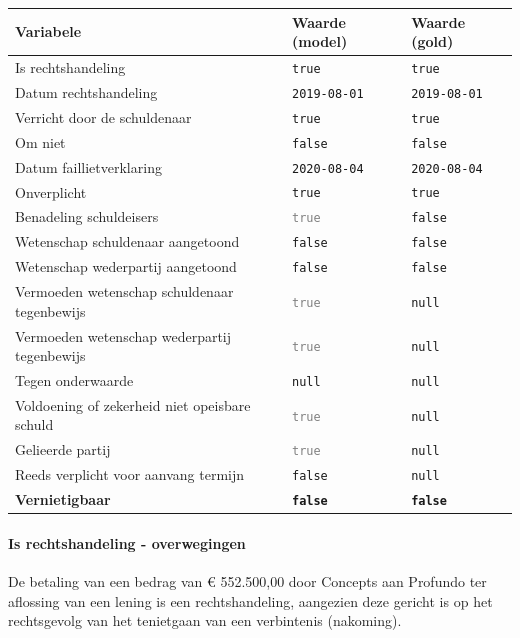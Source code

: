 \documentclass[
  dutch,
  a4paper,
]{article}
\begin{document}
\begin{center}
\small
\begin{tabular}{@{}p{7.4cm}p{2.6cm}p{2.6cm}@{}}
\toprule
Variabele & Waarde (model) & Waarde (gold) \\
\midrule
Is rechtshandeling & \texttt{true} & \texttt{true} \\
Datum rechtshandeling & \texttt{2019-08-01} & \texttt{2019-08-01} \\
Verricht door de schuldenaar & \texttt{true} & \texttt{true} \\
Om niet & \texttt{false} & \texttt{false} \\
Datum faillietverklaring & \texttt{2020-08-04} & \texttt{2020-08-04} \\
Onverplicht & \texttt{true} & \texttt{true} \\
Benadeling schuldeisers & \textcolor{gray}{\texttt{true}} & \texttt{false} \\
Wetenschap schuldenaar aangetoond & \texttt{false} & \texttt{false} \\
Wetenschap wederpartij aangetoond & \texttt{false} & \texttt{false} \\
Vermoeden wetenschap schuldenaar tegenbewijs & \textcolor{gray}{\texttt{true}} & \texttt{null} \\
Vermoeden wetenschap wederpartij tegenbewijs & \textcolor{gray}{\texttt{true}} & \texttt{null} \\
Tegen onderwaarde & \texttt{null} & \texttt{null} \\
Voldoening of zekerheid niet opeisbare schuld & \textcolor{gray}{\texttt{true}} & \texttt{null} \\
Gelieerde partij & \textcolor{gray}{\texttt{true}} & \texttt{null} \\
Reeds verplicht voor aanvang termijn & \texttt{false} & \texttt{null} \\
\textbf{Vernietigbaar} & \textbf{\texttt{false}} & \textbf{\texttt{false}} \\
\bottomrule
\end{tabular}
\end{center}

\paragraph{Is rechtshandeling - overwegingen}\label{is-rechtshandeling---overwegingen-44}

De betaling van een bedrag van € 552.500,00 door Concepts aan Profundo ter aflossing van een lening is een rechtshandeling, aangezien deze gericht is op het rechtsgevolg van het tenietgaan van een verbintenis (nakoming).
\end{document}
